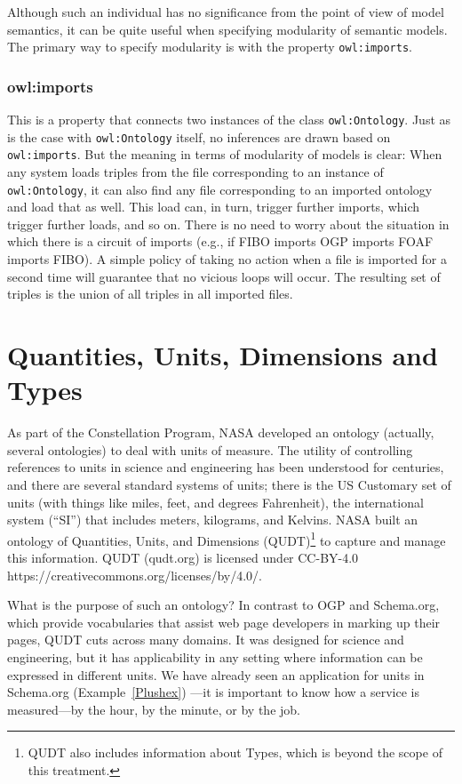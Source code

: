 Although such an individual has no significance from the point of view
of model semantics, it can
be quite useful when specifying modularity of semantic models. The
primary way to specify modularity is with the property \texttt{owl:imports}.

\subsubsection{owl:imports}

This is a property that connects two instances of the class
\texttt{owl:Ontology}. Just as is the case with \texttt{owl:Ontology} itself, no
inferences are drawn based on \texttt{owl:imports}. But the meaning in terms of
modularity of models is clear: When any system loads triples from the
file corresponding to an instance of \texttt{owl:Ontology}, it can also find any
file corresponding to an imported ontology and load that as well. This
load can, in turn, trigger further imports, which trigger further loads,
and so on. There is no need to worry about the situation in which there
is a circuit of imports (e.g., if FIBO imports OGP imports FOAF imports FIBO).
A simple policy of taking no action when a file is imported for a second
time will guarantee that no vicious loops will occur. The resulting set
of triples is the union of all triples in all imported files.




\section{Quantities, Units, Dimensions and Types}
\label{QUDT}

As part of the Constellation Program, NASA developed an ontology 
(actually, several ontologies) to deal
with units of measure. The utility of controlling references to units in
science and engineering has been understood for centuries, and there are
several standard systems of units; there is the US Customary set of
units (with things like miles, feet, and degrees Fahrenheit), the
international system (``SI'') that includes meters, kilograms, and
Kelvins. NASA built an ontology of Quantities, Units, and Dimensions
(QUDT)\footnote{QUDT also includes information about Types, which is beyond the scope
of this treatment.} \cite{QUDT}
to capture and manage this information.  QUDT (qudt.org) is licensed under CC-BY-4.0 https://creativecommons.org/licenses/by/4.0/. 

What is the purpose of such an ontology? In contrast to OGP and Schema.org, 
which provide vocabularies that assist web page developers in
marking up their pages, QUDT cuts across many domains. It was designed
for science and engineering, but it has applicability in any setting
where information can be expressed in different units. We have already
seen an application for units in Schema.org (Example~\ref{Plushex}) 
---it is
important to know how a service is measured---by the hour, by the
minute, or by the job.

